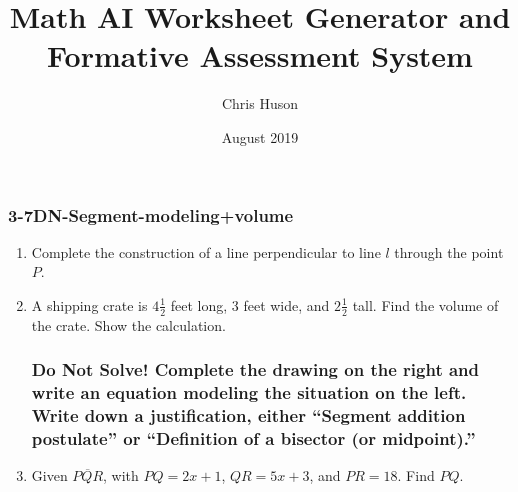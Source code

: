 \documentclass[12pt, twoside]{article}
\title{Math AI Worksheet Generator and Formative Assessment System}
\author{Chris Huson}
\date{August 2019}
\begin{document}
\subsubsection*{3-7DN-Segment-modeling+volume}
\begin{enumerate}
\item Complete the construction of a line perpendicular to line $l$ through the point $P$. 
  \vspace{4cm}
    \begin{center}
    \end{center} \vspace{4cm}
  
\item  A shipping crate is $4 \frac{1}{2}$ feet long, 3 feet wide, and $2 \frac{1}{2}$ tall. Find the volume of the crate. Show the calculation.
  \begin{flushright}
    \end{flushright} \vspace{2cm}

    \newpage
    \subsubsection*{Do Not Solve! Complete the drawing on the right and write an equation modeling the situation on the left. Write down a justification, either ``Segment addition postulate'' or ``Definition of a bisector (or midpoint).''}
    \vspace{0.5cm}
  
\item Given $\overline{PQR}$, with $PQ=2x+1$, $QR=5x+3$, and $PR=18$. Find ${PQ}$. \vspace{1cm}
  \begin{flushright}
    \end{flushright} \vspace{2cm}
  

\end{enumerate}
\end{document}
